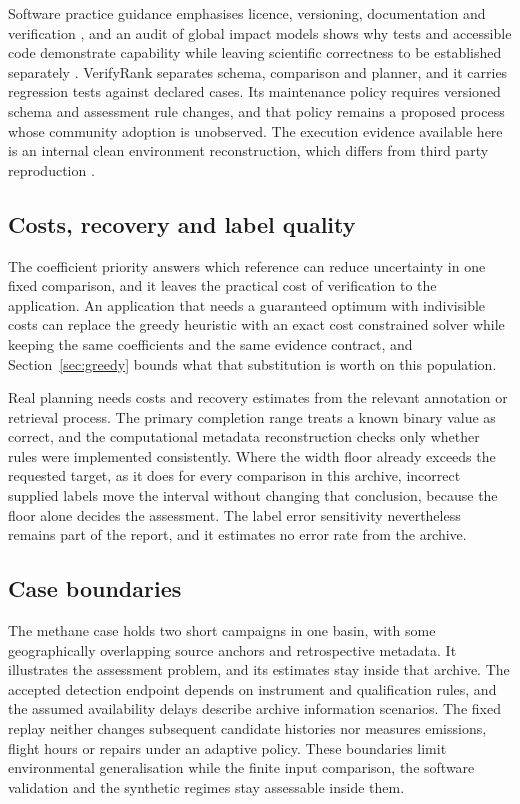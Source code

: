 \documentclass[a4paper,fleqn,longmktitle]{cas-sc}
\begin{document}
Software practice guidance emphasises licence, versioning, documentation and verification \citep{lemmen2024}, and an audit of global impact models shows why tests and accessible code demonstrate capability while leaving scientific correctness to be established separately \citep{nyenah2024}. VerifyRank separates schema, comparison and planner, and it carries regression tests against declared cases. Its maintenance policy requires versioned schema and assessment rule changes, and that policy remains a proposed process whose community adoption is unobserved. The execution evidence available here is an internal clean environment reconstruction, which differs from third party reproduction \citep{essawy2020}.

\subsection{Costs, recovery and label quality}\label{sec:costs}

The coefficient priority answers which reference can reduce uncertainty in one fixed comparison, and it leaves the practical cost of verification to the application. An application that needs a guaranteed optimum with indivisible costs can replace the greedy heuristic with an exact cost constrained solver while keeping the same coefficients and the same evidence contract, and Section~\ref{sec:greedy} bounds what that substitution is worth on this population.

Real planning needs costs and recovery estimates from the relevant annotation or retrieval process. The primary completion range treats a known binary value as correct, and the computational metadata reconstruction checks only whether rules were implemented consistently. Where the width floor already exceeds the requested target, as it does for every comparison in this archive, incorrect supplied labels move the interval without changing that conclusion, because the floor alone decides the assessment. The label error sensitivity nevertheless remains part of the report, and it estimates no error rate from the archive.

\subsection{Case boundaries}\label{sec:boundaries}

The methane case holds two short campaigns in one basin, with some geographically overlapping source anchors and retrospective metadata. It illustrates the assessment problem, and its estimates stay inside that archive. The accepted detection endpoint depends on instrument and qualification rules, and the assumed availability delays describe archive information scenarios. The fixed replay neither changes subsequent candidate histories nor measures emissions, flight hours or repairs under an adaptive policy. These boundaries limit environmental generalisation while the finite input comparison, the software validation and the synthetic regimes stay assessable inside them.
\end{document}
